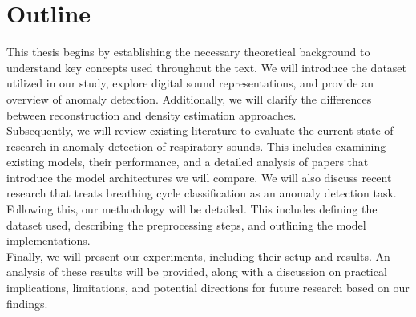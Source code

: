 \section{Outline}
This thesis begins by establishing the necessary theoretical background to understand key concepts used throughout the text. We will introduce the dataset utilized in our study, explore digital sound representations, and provide an overview of anomaly detection. Additionally, we will clarify the differences between reconstruction and density estimation approaches.\\
Subsequently, we will review existing literature to evaluate the current state of research in anomaly detection of respiratory sounds. This includes examining existing models, their performance, and a detailed analysis of papers that introduce the model architectures we will compare. We will also discuss recent research that treats breathing cycle classification as an anomaly detection task.\\
Following this, our methodology will be detailed. This includes defining the dataset used, describing the preprocessing steps, and outlining the model implementations.\\
Finally, we will present our experiments, including their setup and results. An analysis of these results will be provided, along with a discussion on practical implications, limitations, and potential directions for future research based on our findings.


